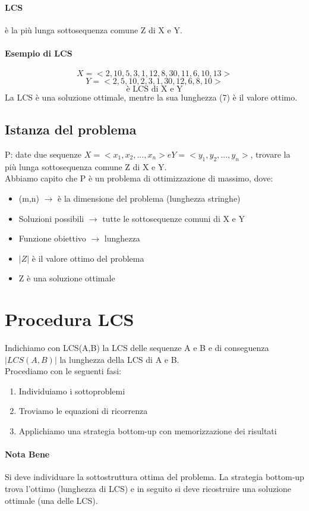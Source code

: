 \paragraph*{LCS} è la più lunga sottosequenza comune Z di X e Y.
\paragraph*{Esempio di LCS}
\[X = <2, 10, 5, 3, 1, 12, 8, 30, 11, 6, 10, 13>\]
\[Y = <2, 5, 10, 2, 3, 1, 30, 12, 6, 8, 10>\]
\[<2, 10, 3, 1, 12, 8, 10> \text{è LCS di X e Y}\]
La LCS è una soluzione ottimale, mentre la sua lunghezza (7) è il valore ottimo.\\
\subsection{Istanza del problema}
P: date due sequenze $X = <x_1, x_2, ..., x_n> e Y = <y_1, y_2, ... , y_n>$, trovare la più lunga
sottosequenza comune Z di X e Y.\\
Abbiamo capito che P è un problema di ottimizzazione di massimo, dove:
\begin{itemize}
    \item (m,n) $\rightarrow$ è la dimensione del problema (lunghezza stringhe)
    \item Soluzioni possibili $\rightarrow$ tutte le sottosequenze comuni di X e Y
    \item Funzione obiettivo $\rightarrow$ lunghezza
    \item $|Z|$ è il valore ottimo del problema
    \item Z è una soluzione ottimale
\end{itemize}
\section{Procedura LCS}
Indichiamo con LCS(A,B) la LCS delle sequenze A e B e di conseguenza $|LCS(A,B)|$
 la lunghezza della LCS di A e B.\\
 Procediamo con le seguenti fasi:
 \begin{enumerate}
    \item Individuiamo i sottoproblemi
    \item Troviamo le equazioni di ricorrenza
    \item Applichiamo una strategia bottom-up con memorizzazione dei risultati
 \end{enumerate}
 \paragraph*{Nota Bene} Si deve individuare la sottostruttura ottima del problema. La strategia bottom-up trova
 l'ottimo (lunghezza di LCS) e in seguito si deve ricostruire una soluzione ottimale (una delle LCS).
